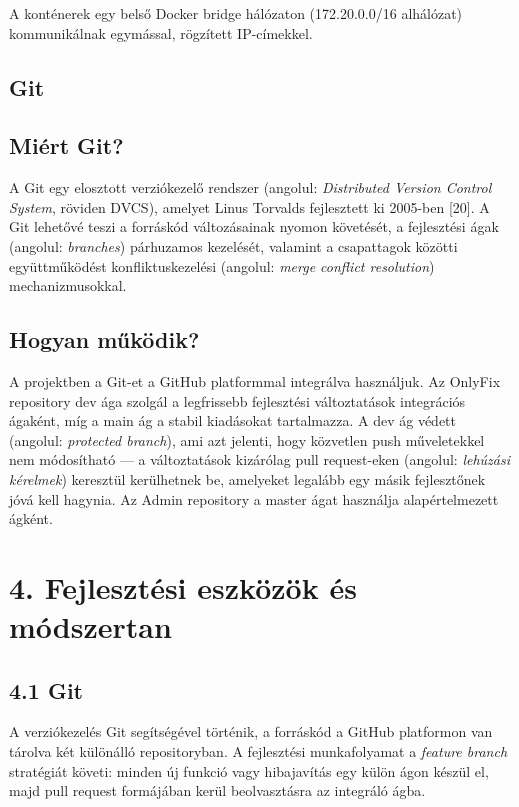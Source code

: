 A konténerek egy belső Docker bridge hálózaton (172.20.0.0/16 alhálózat) kommunikálnak egymással, rögzített IP-címekkel.

\section{Git}\label{git}

\section{Miért Git?}\label{miuxe9rt-git}

A Git egy elosztott verziókezelő rendszer (angolul: \emph{Distributed Version Control System}, röviden DVCS), amelyet Linus Torvalds fejlesztett ki 2005-ben {[}20{]}. A Git lehetővé teszi a forráskód változásainak nyomon követését, a fejlesztési ágak (angolul: \emph{branches}) párhuzamos kezelését, valamint a csapattagok közötti együttműködést konfliktuskezelési (angolul: \emph{merge conflict resolution}) mechanizmusokkal.

\section{Hogyan működik?}\label{hogyan-mux171kuxf6dik-6}

A projektben a Git-et a GitHub platformmal integrálva használjuk. Az OnlyFix repository dev ága szolgál a legfrissebb fejlesztési változtatások integrációs ágaként, míg a main ág a stabil kiadásokat tartalmazza. A dev ág védett (angolul: \emph{protected branch}), ami azt jelenti, hogy közvetlen push műveletekkel nem módosítható --- a változtatások kizárólag pull request-eken (angolul: \emph{lehúzási kérelmek}) keresztül kerülhetnek be, amelyeket legalább egy másik fejlesztőnek jóvá kell hagynia. Az Admin repository a master ágat használja alapértelmezett ágként.

\protect{}\label{_Toc223012185}{}

\chapter{4. Fejlesztési eszközök és módszertan}\label{fejlesztuxe9si-eszkuxf6zuxf6k-uxe9s-muxf3dszertan}

\section{4.1 Git}\label{git-1}

A verziókezelés Git segítségével történik, a forráskód a GitHub platformon van tárolva két különálló repositoryban. A fejlesztési munkafolyamat a \emph{feature branch} stratégiát követi: minden új funkció vagy hibajavítás egy külön ágon készül el, majd pull request formájában kerül beolvasztásra az integráló ágba.

